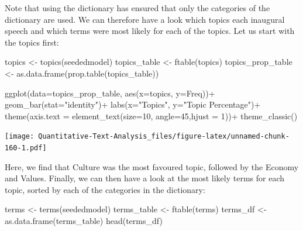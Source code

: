 \documentclass[
]{book}
\newenvironment{Shaded}{\begin{snugshade}}{\end{snugshade}}
\newcommand{\AttributeTok}[1]{\textcolor[rgb]{0.77,0.63,0.00}{#1}}
\newcommand{\DecValTok}[1]{\textcolor[rgb]{0.00,0.00,0.81}{#1}}
\newcommand{\FunctionTok}[1]{\textcolor[rgb]{0.00,0.00,0.00}{#1}}
\newcommand{\NormalTok}[1]{#1}
\newcommand{\OtherTok}[1]{\textcolor[rgb]{0.56,0.35,0.01}{#1}}
\newcommand{\SpecialCharTok}[1]{\textcolor[rgb]{0.00,0.00,0.00}{#1}}
\newcommand{\StringTok}[1]{\textcolor[rgb]{0.31,0.60,0.02}{#1}}
\begin{document}
Note that using the dictionary has ensured that only the categories of the dictionary are used. We can therefore have a look which topics each inaugural speech and which terms were most likely for each of the topics. Let us start with the topics first:

\begin{Shaded}
\begin{Highlighting}[]
\NormalTok{topics }\OtherTok{\textless{}{-}} \FunctionTok{topics}\NormalTok{(seededmodel)}
\NormalTok{topics\_table }\OtherTok{\textless{}{-}} \FunctionTok{ftable}\NormalTok{(topics)}
\NormalTok{topics\_prop\_table }\OtherTok{\textless{}{-}} \FunctionTok{as.data.frame}\NormalTok{(}\FunctionTok{prop.table}\NormalTok{(topics\_table))}

\FunctionTok{ggplot}\NormalTok{(}\AttributeTok{data=}\NormalTok{topics\_prop\_table, }\FunctionTok{aes}\NormalTok{(}\AttributeTok{x=}\NormalTok{topics, }\AttributeTok{y=}\NormalTok{Freq))}\SpecialCharTok{+}
  \FunctionTok{geom\_bar}\NormalTok{(}\AttributeTok{stat=}\StringTok{"identity"}\NormalTok{)}\SpecialCharTok{+}
  \FunctionTok{labs}\NormalTok{(}\AttributeTok{x=}\StringTok{"Topics"}\NormalTok{, }\AttributeTok{y=}\StringTok{"Topic Percentage"}\NormalTok{)}\SpecialCharTok{+}
  \FunctionTok{theme}\NormalTok{(}\AttributeTok{axis.text =} \FunctionTok{element\_text}\NormalTok{(}\AttributeTok{size=}\DecValTok{10}\NormalTok{, }\AttributeTok{angle=}\DecValTok{45}\NormalTok{,}\AttributeTok{hjust =} \DecValTok{1}\NormalTok{))}\SpecialCharTok{+}
  \FunctionTok{theme\_classic}\NormalTok{()}
\end{Highlighting}
\end{Shaded}

\texttt{[image: Quantitative-Text-Analysis\_files/figure-latex/unnamed-chunk-160-1.pdf]}

Here, we find that Culture was the most favoured topic, followed by the Economy and Values. Finally, we can then have a look at the most likely terms for each topic, sorted by each of the categories in the dictionary:

\begin{Shaded}
\begin{Highlighting}[]
\NormalTok{terms }\OtherTok{\textless{}{-}} \FunctionTok{terms}\NormalTok{(seededmodel)}
\NormalTok{terms\_table }\OtherTok{\textless{}{-}} \FunctionTok{ftable}\NormalTok{(terms)}
\NormalTok{terms\_df }\OtherTok{\textless{}{-}} \FunctionTok{as.data.frame}\NormalTok{(terms\_table)}
\FunctionTok{head}\NormalTok{(terms\_df)}
\end{Highlighting}
\end{Shaded}
\end{document}

